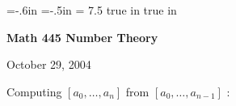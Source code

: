 \def\cmb{\MidnightBlue}	  %
\def\cnb{\NavyBlue}	  %
\def\crb{\RoyalBlue}	  %
\def\cce{\Cerulean}	  %
\def\ccy{\Cyan}		  %
\def\cpb{\ProcessBlue}	  %
\def\csb{\SkyBlue}	  %
\def\ctu{\Turquoise}	  %
\def\ctb{\TealBlue}	  %
\def\caq{\Aquamarine}	  %
\def\cbg{\BlueGreen}	  %
\def\cem{\Emerald}	  %
\def\cjg{\JungleGreen}	  %
\def\csg{\SeaGreen}	  %
\def\cgg{\Green}	  %
\def\cfg{\ForestGreen}	  %
\def\cpg{\PineGreen}	  %
\def\clg{\LimeGreen}	  %
\def\cyg{\YellowGreen}	  %
\def\cspg{\SpringGreen}	  %
\def\cog{\OliveGreen}	  %
\def\pars{\RawSienna}	  %
\def\cse{\Sepia}		  %
\def\cbr{\Brown}		  %
\def\cta{\Tan}		  %
\def\cgr{\Gray}		  %
\def\cbl{\Black}		  %
\def\cwh{\White}		  %


\voffset=-.6in
\hoffset=-.5in
\hsize = 7.5 true in
 true in


\overfullrule=0pt


\def\ctln{\centerline}
\def\u{\underbar}
\def\ssk{\smallskip}
\def\msk{\medskip}
\def\bsk{\bigskip}
\def\hsk{\hskip.1in}
\def\hhsk{\hskip.2in}
\def\dsl{\displaystyle}

\def\lra{$\Leftrightarrow$ }


\ctln{\bf Math 445 Number Theory}

\smallskip

\ctln{October 29, 2004}

\medskip

Computing $[a_0,\ldots ,a_n]$ from $[a_0,\ldots ,a_{n-1}]$ :

